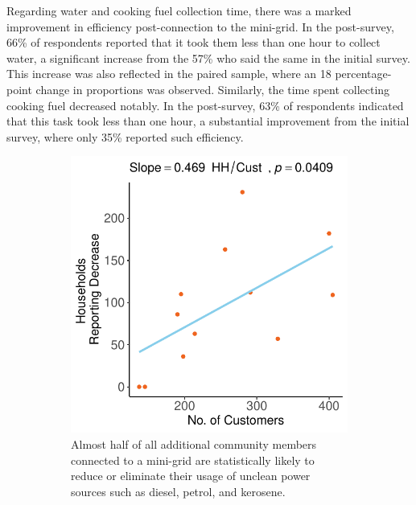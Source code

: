 Regarding water and cooking fuel collection time, there was a marked improvement in efficiency post-connection to the mini-grid. In the post-survey, 66\% of respondents reported that it took them less than one hour to collect water, a significant increase from the 57\% who said the same in the initial survey. This increase was also reflected in the paired sample, where an 18 percentage-point change in proportions was observed. Similarly, the time spent collecting cooking fuel decreased notably. In the post-survey, 63\% of respondents indicated that this task took less than one hour, a substantial improvement from the initial survey, where only 35\% reported such efficiency.

\begin{figure}[th]
	\centering
	\begin{subfigure}[t]{0.48\textwidth}
		\centering
		\includegraphics[width=\textwidth]{images/power_sources_unclean_regression_community.pdf}
		\caption{Almost half of all additional community members connected to a mini-grid are statistically likely to reduce or eliminate their usage of unclean power sources such as diesel, petrol, and kerosene.}
		\label{fig:unclean_power_usage}
	\end{subfigure}
	\hfill
	\begin{subfigure}[t]{0.48\textwidth}

\end{subfigure}
\end{figure}
